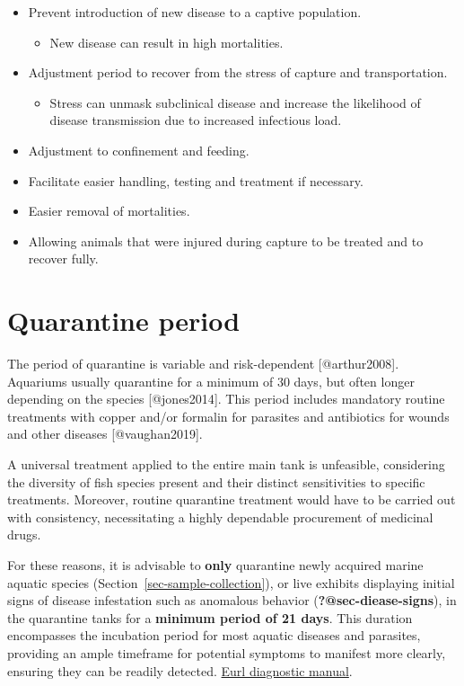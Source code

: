 \documentclass[
  12pt,
]{report}
\providecommand{\tightlist}{%
  \setlength{\itemsep}{0pt}\setlength{\parskip}{0pt}}\usepackage{longtable,booktabs,array}
\begin{document}
\begin{itemize}
\tightlist
\item
  Prevent introduction of new disease to a captive population.

  \begin{itemize}
  \tightlist
  \item
    New disease can result in high mortalities.
  \end{itemize}
\item
  Adjustment period to recover from the stress of capture and
  transportation.

  \begin{itemize}
  \tightlist
  \item
    Stress can unmask subclinical disease and increase the likelihood of
    disease transmission due to increased infectious load.
  \end{itemize}
\item
  Adjustment to confinement and feeding.
\item
  Facilitate easier handling, testing and treatment if necessary.
\item
  Easier removal of mortalities.
\item
  Allowing animals that were injured during capture to be treated and to
  recover fully.
\end{itemize}

\hypertarget{sec-q-period}{%
\section{Quarantine period}\label{sec-q-period}}

The period of quarantine is variable and risk-dependent
{[}@arthur2008{]}. Aquariums usually quarantine for a minimum of 30
days, but often longer depending on the species {[}@jones2014{]}. This
period includes mandatory routine treatments with copper and/or formalin
for parasites and antibiotics for wounds and other diseases
{[}@vaughan2019{]}.

A universal treatment applied to the entire main tank is unfeasible,
considering the diversity of fish species present and their distinct
sensitivities to specific treatments. Moreover, routine quarantine
treatment would have to be carried out with consistency, necessitating a
highly dependable procurement of medicinal drugs.

For these reasons, it is advisable to \textbf{only} quarantine newly
acquired marine aquatic species (Section~\ref{sec-sample-collection}),
or live exhibits displaying initial signs of disease infestation such as
anomalous behavior (\textbf{?@sec-diease-signs}), in the quarantine
tanks for a \textbf{minimum period of 21 days}. This duration
encompasses the incubation period for most aquatic diseases and
parasites, providing an ample timeframe for potential symptoms to
manifest more clearly, ensuring they can be readily detected.
\href{https://www.eurl-fish-crustacean.eu/fish/diagnostic-manuals}{Eurl
diagnostic manual}.
\end{document}
